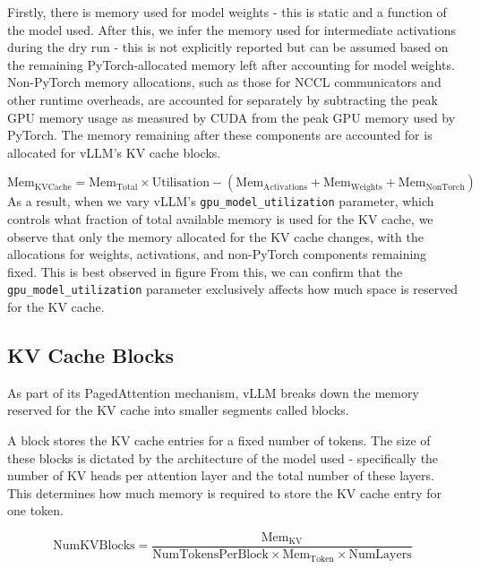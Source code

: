 \documentclass[11pt,twoside]{report}
\begin{document}
Firstly, there is memory used for model weights - this is static and a function of the model used.
After this, we infer the memory used for intermediate activations during the dry run - this is not explicitly reported but can be assumed based on the remaining PyTorch-allocated memory left after accounting for model weights.
Non-PyTorch memory allocations, such as those for NCCL communicators and other runtime overheads, are accounted for separately by subtracting the peak GPU memory usage as measured by CUDA from the peak GPU memory used by PyTorch.
The memory remaining after these components are accounted for is allocated for vLLM's KV cache blocks.

\begin{equation*}
  \text{Mem}_{\text{KVCache}} = \text{Mem}_{\text{Total}} \times \text{Utilisation} - (\text{Mem}_{\text{Activations}} + \text{Mem}_{\text{Weights}} + \text{Mem}_{\text{NonTorch}})
\end{equation*}
As a result, when we vary vLLM’s \texttt{gpu\_model\_utilization} parameter, which controls what fraction of total available memory is used for the KV cache, we observe that only the memory allocated for the KV cache changes, with the allocations for weights, activations, and non-PyTorch components remaining fixed.
This is best observed in figure %
From this, we can confirm that the \texttt{gpu\_model\_utilization} parameter exclusively affects how much space is reserved for the KV cache. %


\subsection{KV Cache Blocks}
As part of its PagedAttention mechanism, vLLM breaks down the memory reserved for the KV cache into smaller segments called blocks.

A block stores the KV cache entries for a fixed number of tokens.
The size of these blocks is dictated by the architecture of the model used - specifically the number of KV heads per attention layer and the total number of these layers.
This determines how much memory is required to store the KV cache entry for one token.

\begin{equation*}
  \text{NumKVBlocks} = \frac{\text{Mem}_{\text{KV}}}{\text{NumTokensPerBlock} \times \text{Mem}_{\text{Token}} \times \text{NumLayers}}
\end{equation*}
\end{document}
